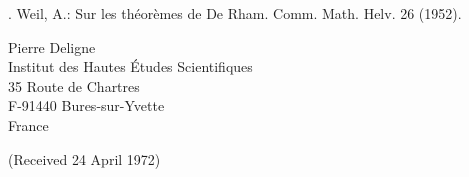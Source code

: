 \documentclass[10pt,a4paper]{article}
\begin{document}
. Weil, A.: Sur les théorèmes de De Rham. Comm. Math. Helv. 26 (1952).\par

\begin{flushleft}
Pierre Deligne\\
Institut des Hautes Études Scientifiques\\
35 Route de Chartres\\
F-91440 Bures-sur-Yvette\\
France
\end{flushleft}

(Received 24 April 1972)\par


\endgroup
\end{document}
